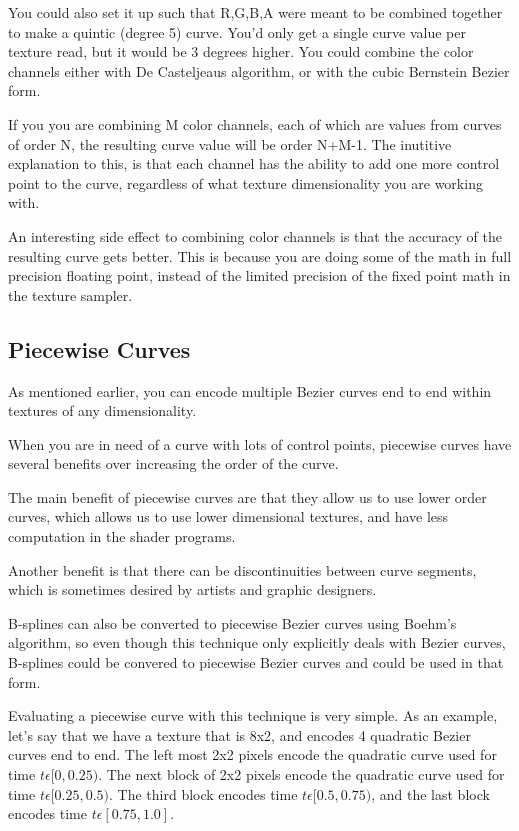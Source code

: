 \documentclass{jcgt}
\begin{document}
You could also set it up such that R,G,B,A were meant to be combined together to make a quintic (degree 5) curve.  You'd only get a single curve value per texture read, but it would be 3 degrees higher.  You could combine the color channels either with De Casteljeaus algorithm, or with the cubic Bernstein Bezier form. 

If you you are combining M color channels, each of which are values from curves of order N, the resulting curve value will be order N+M-1.  The inutitive explanation to this, is that each channel has the ability to add one more control point to the curve, regardless of what texture dimensionality you are working with.

An interesting side effect to combining color channels is that the accuracy of the resulting curve gets better.  This is because you are doing some of the math in full precision floating point, instead of the limited precision of the fixed point math in the texture sampler.

\subsection{Piecewise Curves}

As mentioned earlier, you can encode multiple Bezier curves end to end within textures of any dimensionality.

When you are in need of a curve with lots of control points, piecewise curves have several benefits over increasing the order of the curve.

The main benefit of piecewise curves are that they allow us to use lower order curves, which allows us to use lower dimensional textures, and have less computation in the shader programs.

Another benefit is that there can be discontinuities between curve segments, which is sometimes desired by artists and graphic designers.

B-splines can also be converted to piecewise Bezier curves using Boehm's algorithm, so even though this technique only explicitly deals with Bezier curves, B-splines could be convered to piecewise Bezier curves and could be used in that form.

Evaluating a piecewise curve with this technique is very simple.  As an example, let's say that we have a texture that is 8x2, and encodes 4 quadratic Bezier curves end to end. The left most 2x2 pixels encode the quadratic curve used for time $t \epsilon [0,0.25)$.  The next block of 2x2 pixels encode the quadratic curve used for time $t \epsilon [0.25,0.5)$.  The third block encodes time $t \epsilon [0.5,0.75)$, and the last block encodes time $t \epsilon [0.75,1.0]$.
\end{document}
